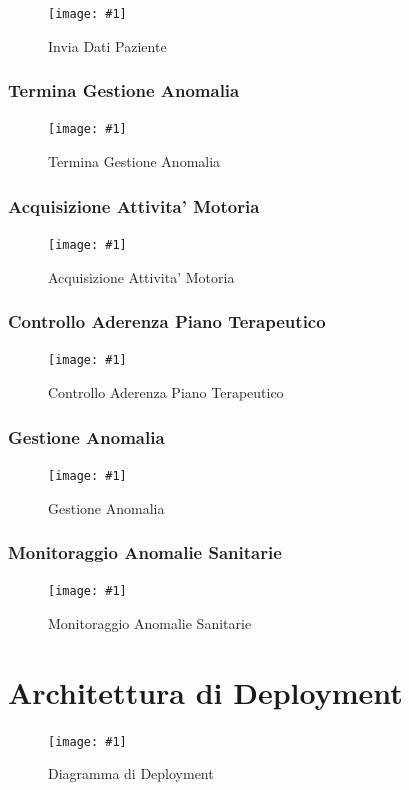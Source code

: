 \documentclass[a4paper,11pt,oneside, table]{article}
\newcommand{\putimage}[4] {
	\begin{figure}[H]
	    \centering
	    \texttt{[image: \#1]}
	    \caption{#2}\label{#3}
	\end{figure}
}
\begin{document}
\putimage{images/Diagramma di Sequenza/Invia Dati Paziente.png}{Invia Dati Paziente}{png:invia-dati-paziente}{1}


\subsubsection{Termina Gestione Anomalia}

\putimage{images/Diagramma di Sequenza/Termina Gestione Anomalia.png}{Termina Gestione Anomalia}{png:termina-gestione-anomalia}{1}


\subsubsection{Acquisizione Attivita' Motoria}

\putimage{images/Diagramma di Sequenza/Acquisizione Attivita' Motoria.png}{Acquisizione Attivita' Motoria}{png:acquisizione-attivita-motoria}{1}


\subsubsection{Controllo Aderenza Piano Terapeutico}

\putimage{images/Diagramma di Sequenza/Controllo Aderenza Piano Terapeutico.png}{Controllo Aderenza Piano Terapeutico}{png:controllo-aderenza-piano-terapeutico}{1}


\subsubsection{Gestione Anomalia}

\putimage{images/Diagramma di Sequenza/Gestione Anomalia.png}{Gestione Anomalia}{png:gestione-anomalia}{1}


\subsubsection{Monitoraggio Anomalie Sanitarie}

\putimage{images/Diagramma di Sequenza/Monitoraggio Anomalie Sanitarie.png}{Monitoraggio Anomalie Sanitarie}{png:monitoraggio-anomalie-sanitarie}{1}

\section{Architettura di Deployment}

\putimage{images/Diagramma di Deployment.png}{Diagramma di Deployment}{png:diagramma-di-deployment}{1}
\end{document}
